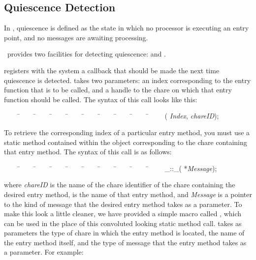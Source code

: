 \subsection{Quiescence Detection}

In \charmpp, quiescence is defined as the state in which no
processor is executing an entry point, and no messages are awaiting processing.

\charmpp\ provides two facilities for detecting quiescence:  and
.  

 registers with the system a callback that should be made the
next time quiescence is detected.   takes two
parameters: an index corresponding to the entry function that is to be called,
and a handle to the chare on which that entry function should be called.  The
syntax of this call looks like this:

\begin{tabbing}
~~~~ \=~~~~ \=~~~~ \=~~~~ \=~~~~ \=~~~~ \=~~~~ \=~~~~ \=~~~~ \=~~~~ \kill
\> ( {\it Index},  {\it chareID});
\end{tabbing}

To retrieve the corresponding index of a particular entry
method, you must use a static method contained within the
 object corresponding to the chare
containing that entry method.  The syntax of this call is as follows:

\begin{tabbing}
~~~~ \=~~~~ \=~~~~ \=~~~~ \=~~~~ \=~~~~ \=~~~~ \=~~~~ \=~~~~ \=~~~~ \kill
{}\_::\_(
*{\it Message});
\end{tabbing}

where {\it chareID} is the name of the chare identifier of the chare containing
the desired entry method,  is the name of that entry method,
and {\it Message} is a pointer to the kind of message that the desired entry
method takes as a parameter. To make this look a little cleaner, we have
provided a simple macro called , which can be used in the place
of this convoluted looking static method call.
 takes as parameters the type of chare in
which the entry method is located, the name of the entry method itself, and the
type of message that the entry method takes as a parameter. For example:


